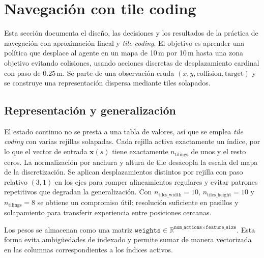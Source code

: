 \documentclass[a4paper,12pt]{article}
\newcommand{\vacio}{\textcolor{white}{ .}}
\begin{document}
\pagestyle{fancy}

\renewcommand{\footrulewidth}{0.5pt}
\fancyfoot[C]{\vacio}


\renewcommand{\contentsname}{Índice}
\tableofcontents
{}

\newpage
\section{Navegación con tile coding}

Esta sección documenta el diseño, las decisiones y los resultados de la práctica de navegación con aproximación lineal y \textit{tile coding}. El objetivo es aprender una política que desplace al agente en un mapa de 10\,m por 10\,m hasta una zona objetivo evitando colisiones, usando acciones discretas de desplazamiento cardinal con paso de 0.25\,m. Se parte de una observación cruda $(x,y,\text{collision},\text{target})$ y se construye una representación dispersa mediante tiles solapados.

\subsection{Representación y generalización}
El estado continuo no se presta a una tabla de valores, así que se emplea \textit{tile coding} con varias rejillas solapadas. Cada rejilla activa exactamente un índice, por lo que el vector de entrada $\mathbf{x}(s)$ tiene exactamente $n_{\text{tilings}}$ de unos y el resto ceros. La normalización por anchura y altura de tile desacopla la escala del mapa de la discretización. Se aplican desplazamientos distintos por rejilla con paso relativo $(3,1)$ en los ejes para romper alineamientos regulares y evitar patrones repetitivos que degradan la generalización. Con $n_{\text{tiles\_width}}=10$, $n_{\text{tiles\_height}}=10$ y $n_{\text{tilings}}=8$ se obtiene un compromiso útil: resolución suficiente en pasillos y solapamiento para transferir experiencia entre posiciones cercanas.

Los pesos se almacenan como una matriz $\texttt{weights}\in\mathbb{R}^{\texttt{num\_actions}\times\texttt{feature\_size}}$. Esta forma evita ambigüedades de indexado y permite sumar de manera vectorizada en las columnas correspondientes a los índices activos.
\end{document}
